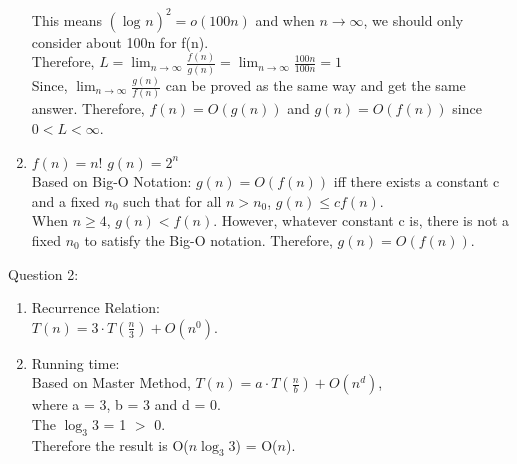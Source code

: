 \documentclass[12pt]{article}
\begin{document}
\begin{enumerate}[label=(\alph*)]
    This means $(\log_{}{n})^2 = o(100n)$ and when $n\rightarrow\infty$, we should only consider about 100n for f(n). \vspace{1mm} \\
    Therefore, $L = \lim_{n\to\infty} \frac{f(n)}{g(n)} = \lim_{n\to\infty} \frac{100n}{100n} = 1  $\vspace{2mm} \vspace{1mm} \\
    Since, $\lim_{n\to\infty} \frac{g(n)}{f(n)}$ can be proved as the same way and get the same answer. Therefore, $f(n) = O(g(n)) $ and $g(n) = O(f(n)) $ since $0 < L < \infty$.
  \item $f(n) = n!$ \hspace{1cm} $g(n) = 2^n$ \vspace{1mm} \\
    Based on Big-O Notation: $g(n) = O(f(n))$ iff there exists a constant c and a fixed $n_0$ such that for all $n > n_0$, $g(n) \leq cf(n)$. \vspace{1mm} \\
    When $n \geq 4$, $g(n) < f(n)$. However, whatever constant c is, there is not a fixed $n_0$ to satisfy the Big-O notation. Therefore, $g(n) = O(f(n))$.
\end{enumerate}


\pagebreak
\large Question 2:\\
\normalsize 
\begin{enumerate}
\item Recurrence Relation: \\
$T(n) = 3 \cdot T(\frac{n}{3}) + O(n^0)$.
\item Running time:\\
Based on Master Method, $T(n) = a \cdot T(\frac{n}{b}) + O(n^d)$,\\
where a = 3, b = 3 and d = 0.\\
The ${\log_3 3}$ = 1 $>$ 0. \\
Therefore the result is O($n{\log_3 3}$) = O($n$).
\end{enumerate}
\end{document}
